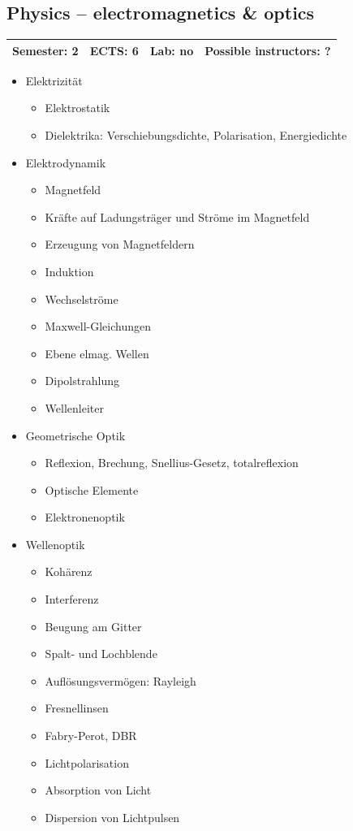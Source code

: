 \documentclass[12pt,twoside,fleqn,a4paper]{article}
\begin{document}
\subsection{Physics -- electromagnetics \& optics}
\begin{tabular}{llll} \hline
\textbf{Semester:} 2 & \textbf{ECTS:} 6 & \textbf{Lab:} no & \textbf{Possible instructors:} ?\\
\hline
\end{tabular}

\begin{itemize}
\setlength\itemsep{0cm}
\item Elektrizität
\begin{itemize}
\item Elektrostatik
\item Dielektrika: Verschiebungsdichte, Polarisation, Energiedichte
\end{itemize}

\item Elektrodynamik
\begin{itemize}
\item Magnetfeld
\item Kräfte auf Ladungsträger und Ströme im Magnetfeld
\item Erzeugung von Magnetfeldern
\item Induktion
\item Wechselströme
\item Maxwell-Gleichungen
\item Ebene elmag. Wellen
\item Dipolstrahlung
\item Wellenleiter
\end{itemize}

\item Geometrische Optik
\begin{itemize}
\item Reflexion, Brechung, Snellius-Gesetz, totalreflexion
\item Optische Elemente
\item Elektronenoptik
\end{itemize}

\item Wellenoptik
\begin{itemize}
\item Kohärenz
\item Interferenz
\item Beugung am Gitter
\item Spalt- und Lochblende
\item Auflösungsvermögen: Rayleigh
\item Fresnellinsen
\item Fabry-Perot, DBR
\item Lichtpolarisation
\item Absorption von Licht
\item Dispersion von Lichtpulsen
\end{itemize}


\end{itemize}
\end{document}
